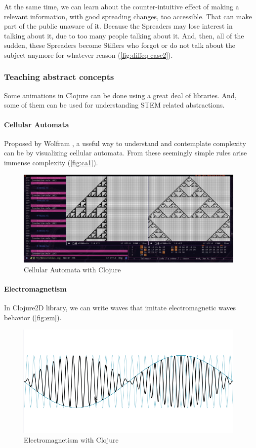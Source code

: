 \documentclass[
12pt,				%
openright,			%
oneside,			%
a4paper,			%
brazil,				%
english,			  %
]{abntex2}
\begin{document}
At the same time, we can learn about the counter-intuitive effect of making a relevant information, with good spreading changes, too accessible. That can make part of the public unaware of it. Because the Spreaders may lose interest in talking about it, due to too many people talking about it. And, then, all of the sudden, these Spreaders become Stiflers who forgot or do not talk about the subject anymore for whatever reason (\autoref{fig:diffeq-case2}).
\clearpage
\subsubsection{Teaching abstract concepts}

Some animations in Clojure can be done using a great deal of
libraries. And, some of them can be used for understanding STEM
related abstractions.

\paragraph{Cellular Automata}

Proposed by Wolfram \cite{wolfram1983cellular}, a useful way to
understand and contemplate complexity can be by visualizing cellular
automata. From these seemingly simple rules arise immense complexity (\autoref{fig:ca1}).

\begin{figure}[ht]
  \centering
    \caption{\label{fig:ca1} Cellular Automata with Clojure}
  \includegraphics[width=0.7\linewidth]{Imagens/CA/ca1.png}
\end{figure}

\paragraph{Electromagnetism}

In Clojure2D library, we can write waves that imitate electromagnetic
waves behavior (\autoref{fig:em}). 

\begin{figure}[ht]
  \centering
    \caption{\label{fig:em} Electromagnetism with Clojure}
  \includegraphics[width=0.7\linewidth]{Imagens/CA/eletromag-is.png}
\end{figure}
\end{document}
